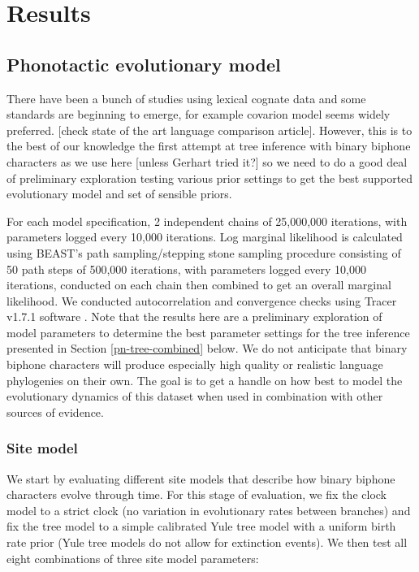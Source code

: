 \hypertarget{pn-tree-results}{%
\section{Results}\label{pn-tree-results}}

\hypertarget{phonotactic-evo-model}{%
\subsection{Phonotactic evolutionary model}\label{phonotactic-evo-model}}

There have been a bunch of studies using lexical cognate data and some standards are beginning to emerge, for example covarion model seems widely preferred. {[}check state of the art language comparison article{]}. However, this is to the best of our knowledge the first attempt at tree inference with binary biphone characters as we use here {[}unless Gerhart tried it?{]} so we need to do a good deal of preliminary exploration testing various prior settings to get the best supported evolutionary model and set of sensible priors.

For each model specification, 2 independent chains of 25,000,000 iterations, with parameters logged every 10,000 iterations. Log marginal likelihood is calculated using BEAST's path sampling/stepping stone sampling procedure \autocites{baele_improving_2012}{baele_accurate_2013} consisting of 50 path steps of 500,000 iterations, with parameters logged every 10,000 iterations, conducted on each chain then combined to get an overall marginal likelihood. We conducted autocorrelation and convergence checks using Tracer v1.7.1 software \autocite{rambaut_posterior_2018}. Note that the results here are a preliminary exploration of model parameters to determine the best parameter settings for the tree inference presented in Section \ref{pn-tree-combined} below. We do not anticipate that binary biphone characters will produce especially high quality or realistic language phylogenies on their own. The goal is to get a handle on how best to model the evolutionary dynamics of this dataset when used in combination with other sources of evidence.

\hypertarget{site-model}{%
\subsubsection{Site model}\label{site-model}}

We start by evaluating different site models that describe how binary biphone characters evolve through time. For this stage of evaluation, we fix the clock model to a strict clock (no variation in evolutionary rates between branches) and fix the tree model to a simple calibrated Yule tree model with a uniform birth rate prior (Yule tree models do not allow for extinction events). We then test all eight combinations of three site model parameters:

